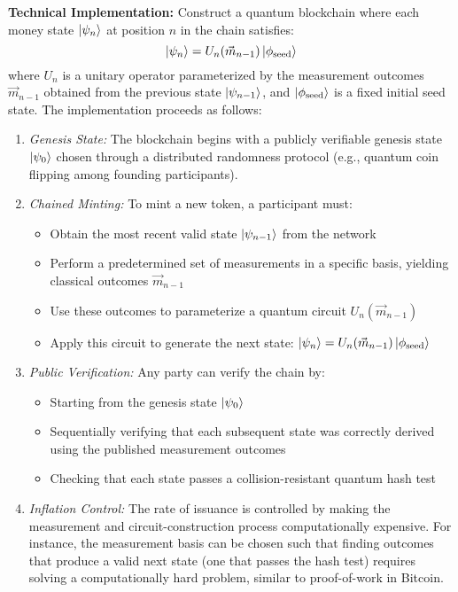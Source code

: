 \documentclass[a4paper,10.5pt,twoside]{article}
\begin{document}
\textbf{Technical Implementation:} Construct a quantum blockchain where each money state $\ket{\psi_n}$ at position $n$ in the chain satisfies:
\begin{equation}
\ket{\psi_n} = U_n(\vec{m}_{n-1}) \ket{\phi_{\text{seed}}}
\end{equation}
where $U_n$ is a unitary operator parameterized by the measurement outcomes $\vec{m}_{n-1}$ obtained from the previous state $\ket{\psi_{n-1}}$, and $\ket{\phi_{\text{seed}}}$ is a fixed initial seed state. The implementation proceeds as follows:

\begin{enumerate}
\item \textit{Genesis State:} The blockchain begins with a publicly verifiable genesis state $\ket{\psi_0}$ chosen through a distributed randomness protocol (e.g., quantum coin flipping among founding participants).

\item \textit{Chained Minting:} To mint a new token, a participant must:
\begin{itemize}
    \item Obtain the most recent valid state $\ket{\psi_{n-1}}$ from the network
    \item Perform a predetermined set of measurements in a specific basis, yielding classical outcomes $\vec{m}_{n-1}$
    \item Use these outcomes to parameterize a quantum circuit $U_n(\vec{m}_{n-1})$
    \item Apply this circuit to generate the next state: $\ket{\psi_n} = U_n(\vec{m}_{n-1}) \ket{\phi_{\text{seed}}}$
\end{itemize}

\item \textit{Public Verification:} Any party can verify the chain by:
\begin{itemize}
    \item Starting from the genesis state $\ket{\psi_0}$
    \item Sequentially verifying that each subsequent state was correctly derived using the published measurement outcomes
    \item Checking that each state passes a collision-resistant quantum hash test
\end{itemize}

\item \textit{Inflation Control:} The rate of issuance is controlled by making the measurement and circuit-construction process computationally expensive. For instance, the measurement basis can be chosen such that finding outcomes that produce a valid next state (one that passes the hash test) requires solving a computationally hard problem, similar to proof-of-work in Bitcoin.
\end{enumerate}
\end{document}
